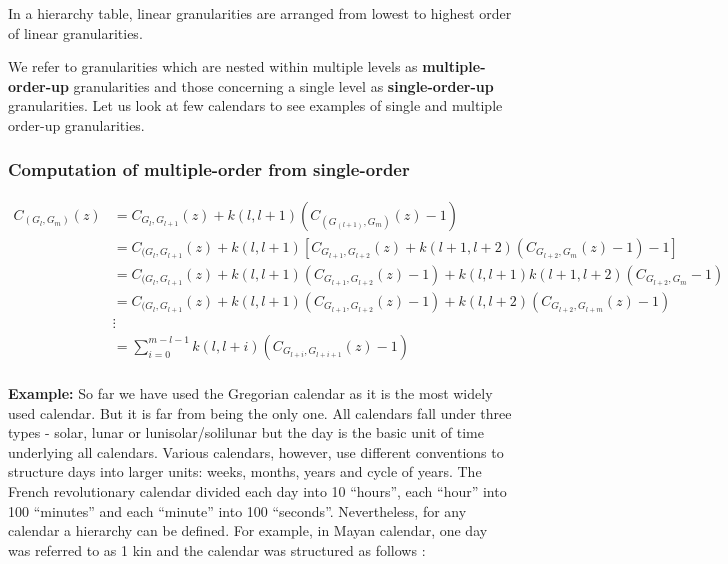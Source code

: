 \documentclass[12pt]{article}
\begin{document}
In a hierarchy table, linear granularities are arranged from lowest to
highest order of linear granularities.

We refer to granularities which are nested within multiple levels as
\textbf{multiple-order-up} granularities and those concerning a single
level as \textbf{single-order-up} granularities. Let us look at few
calendars to see examples of single and multiple order-up granularities.

\hypertarget{sec:multiplefromsingle}{%
\subsubsection{Computation of multiple-order from
single-order}\label{sec:multiplefromsingle}}

\begin{equation} \label{eq7}
\begin{split}
C_{(G_l,G_m)}(z) & = C_{G_l,G_{l+1}}(z) + k(l, l+1)(C_{(G_(l+1),G_m)}(z)-1) \\  
  & =   C_{(G_l,G_{l+1}}(z) + k(l, l+1)[ C_{G_{l+1},G_{l+2}}(z) + k(l+1, l+2)( C_{G_{l+2}, G_m}(z) - 1) - 1] \\
  & =  C_{(G_l,G_{l+1}}(z) + k(l, l+1)(C_{G_{l+1},G_{l+2}}(z) - 1) + k(l, l+1)k(l+1, l+2)(C_{G_{l+2}, G_{m}} - 1)\\
  & =  C_{(G_l,G_{l+1}}(z) + k(l, l+1)(C_{G_{l+1},G_{l+2}}(z) - 1) + k(l, l+2)(C_{G_{l+2},G_{l+m}}(z) - 1)\\
  &\vdots\\
  & = \sum_{i=0}^{m - l - 1} k(l, l+i)(C_{G_{l+i},G_{l+i+1}}(z) - 1)\\
\end{split}
\end{equation}

\textbf{Example:} So far we have used the Gregorian calendar as it is
the most widely used calendar. But it is far from being the only one.
All calendars fall under three types - solar, lunar or
lunisolar/solilunar but the day is the basic unit of time underlying all
calendars. Various calendars, however, use different conventions to
structure days into larger units: weeks, months, years and cycle of
years. The French revolutionary calendar divided each day into 10
``hours'', each ``hour'' into 100 ``minutes'' and each ``minute'' into
100 ``seconds''. Nevertheless, for any calendar a hierarchy can be
defined. For example, in Mayan calendar, one day was referred to as 1
kin and the calendar was structured as follows \citep{Reingold2001-kf}:
\end{document}
